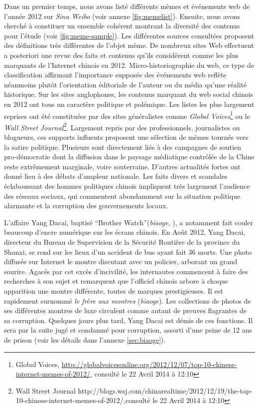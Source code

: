 Dans un premier temps, nous avons listé différents mèmes et événements web de l{\textquoteright}année 2012 sur \textit{Sina Weibo} (voir annexe \ref{fig:memelist}). Ensuite, nous avons cherché à constituer un ensemble cohérent montrant la diversité des contenus pour l'étude (voir \ref{fig:meme-sample}). Les différentes sources consultées proposent des définitions très différentes de l'objet mème. De nombreux sites Web effectuent a posteriori une revue des faits et contenus qu'ils considèrent comme les plus marquants de l'Internet chinois en 2012. Micro-historiographie du web, ce type de classification affirmant l'importance supposée des événements web reflète néanmoins plutôt l'orientation éditoriale de l'auteur ou du média qu'une réalité historique. Sur les sites anglophones, les contenus marquant du web social chinois en 2012 ont tous un caractère politique et polémique. Les listes les plus largement reprises ont été constituées par des sites généralistes comme \textit{Global Voices}\footnote{Global Voices, \url{http://globalvoicesonline.org/2012/12/07/top-10-chinese-internet-memes-of-2012/}, consulté le 22 Avril 2014 à 12:10} ou le \textit{Wall Street Journal}\footnote{ Wall Street Journal http://blogs.wsj.com/chinarealtime/2012/12/19/the-top-10-chinese-internet-memes-of-2012/,consulté le 22 Avril 2014 à 12:10}. Largement repris par des professionnels, journalistes ou blogueurs, ces supports influents proposent une sélection de mèmes tournés vers la satire politique. Plusieurs sont directement liés à des campagnes de soutien pro-démocratie dont la diffusion dans le paysage médiatique contrôlée de la Chine reste extrêmement marginale, voire souterraine. D'autres actualités fortes ont donné lieu à des débats d'ampleur nationale. Les faits divers et scandales éclaboussant des hommes politiques chinois impliquent très largement l'audience des réseaux sociaux, qui commentent abondamment sur la situation politique alarmante et la corruption des gouvernements locaux. 

L'affaire Yang Dacai, baptisé ``Brother Watch''(\textit{biaoge}, ), a notamment fait couler beaucoup d'encre numérique sur les écrans chinois. En Août 2012, Yang Dacai, directeur du Bureau de Supervision de la Sécurité Routière de la province du Shanxi, se rend sur les lieux d'un accident de bus ayant fait 36 morts. Une photo diffusée sur Internet le montre discutant avec un policier, arborant un grand sourire. Agacés par cet excès d'incivilité, les internautes commencent à faire des recherches à son sujet et remarquent que l'officiel chinois arbore à chaque apparition une montre différente, toutes de marques prestigieuses. Il est rapidement surnommé \textit{le frère aux montres} (\textit{biaoge}). Les collections de photos de ses différentes montres de luxe circulent comme autant de preuves flagrantes de sa corruption. Quelques jours plus tard, Yang Dacai est démis de ces fonctions. Il sera par la suite jugé et condamné pour corruption, assorti d'une peine de 12 ans de prison (voir les détails dans l'annexe \ref{sec:biaoge}). 

